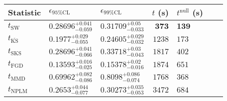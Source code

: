 \begin{tabular}{l|llr|llr}
Statistic & $\epsilon_{95\%\mathrm{CL}}$ & $\epsilon_{99\%\mathrm{CL}}$ & $t$ (s) & $t^{\mathrm{null}}$ (s) \\
	\midrule
	$t_{\mathrm{SW}}$ & $0.28696_{-0.059}^{+0.041}$ & $0.31709_{-0.033}^{+0.05}$ & ${\mathbf{373}}$ & ${\mathbf{139}}$ \\
	$t_{\overline{\mathrm{KS}}}$ & $0.1977_{-0.055}^{+0.029}$ & $0.24605_{-0.032}^{+0.029}$ & $1238$ & $173$ \\
	$t_{\mathrm{SKS}}$ & $0.28696_{-0.066}^{+0.041}$ & $0.33718_{-0.043}^{+0.03}$ & $1817$ & $402$ \\
	$t_{\mathrm{FGD}}$ & ${\mathbf{0.13593_{-0.025}^{+0.016}}}$ & ${\mathbf{0.15378_{-0.016}^{+0.02}}}$ & $1874$ & $651$ \\
	$t_{\mathrm{MMD}}$ & $0.69962_{-0.086}^{+0.082}$ & $0.8098_{-0.074}^{+0.086}$ & $1768$ & $368$ \\
\rowcolor{red!35}	$t_{\mathrm{NPLM}}$ & $0.2653_{-0.077}^{+0.044}$ & $0.30273_{-0.053}^{+0.035}$ & $3472$ & $684$ \\
	\bottomrule
\end{tabular}